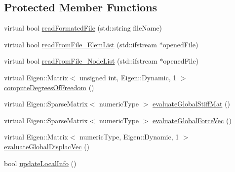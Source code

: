 \subsection*{Protected Member Functions}
\begin{DoxyCompactItemize}
\item 
virtual bool \mbox{\hyperlink{classbase_structural_analysis_class_aa21d6e5d9eea16e4fb57845d93d1ec4b}{read\+Formated\+File}} (std\+::string file\+Name)
\item 
virtual bool \mbox{\hyperlink{classbase_structural_analysis_class_a57fe62169a4032b8c8393d9adb058343}{read\+From\+File\+\_\+\+Elem\+List}} (std\+::ifstream $\ast$opened\+File)
\item 
virtual bool \mbox{\hyperlink{classbase_structural_analysis_class_ad81d20f7c98e21692e68db5019d0e8ae}{read\+From\+File\+\_\+\+Node\+List}} (std\+::ifstream $\ast$opened\+File)
\item 
virtual Eigen\+::\+Matrix$<$ unsigned int, Eigen\+::\+Dynamic, 1 $>$ \mbox{\hyperlink{classbase_structural_analysis_class_aca53b1f1642a1dae799df8f906479f93}{compute\+Degrees\+Of\+Freedom}} ()
\item 
virtual Eigen\+::\+Sparse\+Matrix$<$ numeric\+Type $>$ \mbox{\hyperlink{classbase_structural_analysis_class_a773fa080feae6b17e47e58e5ed810885}{evaluate\+Global\+Stiff\+Mat}} ()
\item 
virtual Eigen\+::\+Sparse\+Matrix$<$ numeric\+Type $>$ \mbox{\hyperlink{classbase_structural_analysis_class_a7cfa00b107c0014bbc7f364791949ef6}{evaluate\+Global\+Force\+Vec}} ()
\item 
virtual Eigen\+::\+Matrix$<$ numeric\+Type, Eigen\+::\+Dynamic, 1 $>$ \mbox{\hyperlink{classbase_structural_analysis_class_a8ae8b924f3c1c20f131db1570544cb90}{evaluate\+Global\+Displac\+Vec}} ()
\item 
bool \mbox{\hyperlink{classbase_structural_analysis_class_a51b20160503d1a07359ae5e174b582c4}{update\+Local\+Info}} ()
\end{DoxyCompactItemize}
